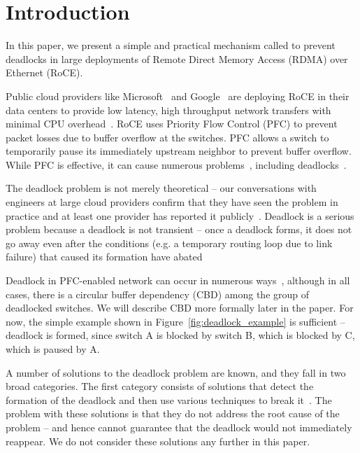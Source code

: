 \section{Introduction}
\label{sec:intro}

In this paper, we present a simple and practical mechanism called \sysname{} to prevent deadlocks
in large deployments of Remote Direct Memory Access (RDMA) over Ethernet (RoCE).

Public cloud providers like Microsoft~\cite{dcqcn} and Google~\cite{timely} are
deploying RoCE in their data centers to provide low latency, high throughput
network transfers with minimal CPU overhead~\cite{dcqcn}.  RoCE uses Priority
Flow Control (PFC) to prevent packet losses due to buffer overflow at the
switches. PFC allows a switch to temporarily pause its immediately upstream
neighbor to prevent buffer overflow. While PFC is effective, it can cause
numerous problems~\cite{dcqcn}, including deadlocks~\cite{rdmaatscale,tcp-bolt,hu2016deadlocks}.

The deadlock problem is not merely theoretical -- our conversations with engineers at large
cloud providers confirm that they have seen the problem in practice and at least
one provider has reported it publicly~\cite{rdmaatscale}. Deadlock is a serious
problem because a deadlock is not transient -- once a deadlock forms, it does not go
away even after the conditions (e.g. a temporary routing loop due to link
failure) that caused its formation have abated~\cite{rdmaatscale}

Deadlock in PFC-enabled network can occur in numerous ways~\cite{hu2016deadlocks},
although in all cases, there is a circular buffer dependency (CBD) among the
group of deadlocked switches. We will describe CBD more formally later in the
paper. For now, the simple example shown in Figure~\ref{fig:deadlock_example} is sufficient --
deadlock is formed, since switch A is blocked by switch B, which is blocked by
C, which is paused by A.

A number of solutions to the deadlock problem are known, and they fall in two
broad categories. The first category consists of solutions that detect the
formation of the deadlock and then use various techniques to break
it~\cite{shpiner2016unlocking}. The problem with these solutions is that they do
not address the root cause of the problem -- and hence cannot guarantee that the
deadlock would not immediately reappear. We do not consider these solutions any
further in this paper. 

